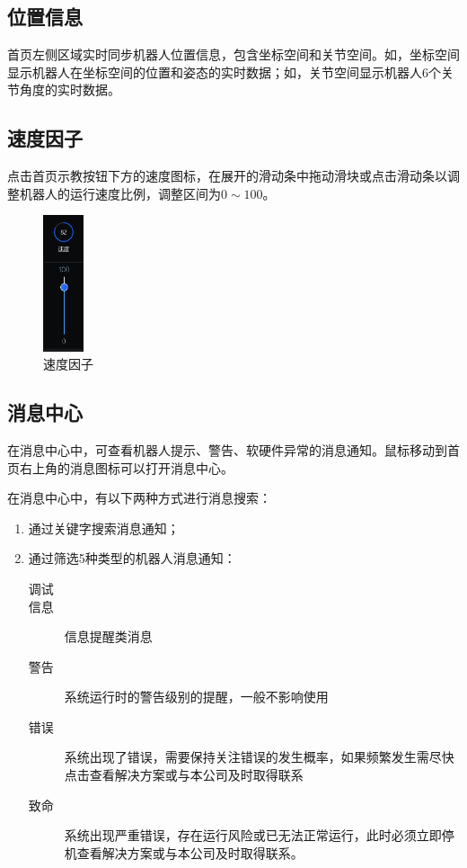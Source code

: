 \subsection{位置信息}
\LM 首页左侧区域实时同步机器人位置信息，包含坐标空间和关节空间。如，坐标空间显示机器人在坐标空间的位置和姿态的实时数据；如，关节空间显示机器人6个关节角度的实时数据。

\subsection{速度因子}
点击\LM 首页示教按钮下方的速度图标，在展开的滑动条中拖动滑块或点击滑动条以调整机器人的运行速度比例，调整区间为$0\sim 100$。

\begin{figure}[ht]
	\centering
	\includegraphics[height=4cm]{screen/2-13.png}
	\caption{速度因子}
	\label{fig:速度因子}
\end{figure}

\subsection{消息中心}
在消息中心中，可查看机器人提示、警告、软硬件异常的消息通知。鼠标移动到\LM 首页右上角的消息图标可以打开消息中心。

在消息中心中，有以下两种方式进行消息搜索：
\begin{enumerate}
	\item 通过关键字搜索消息通知；
	\item 通过筛选5种类型的机器人消息通知：
	\begin{description}
\item[ 调试]
\item[ 信息] 信息提醒类消息
\item[ 警告] 系统运行时的警告级别的提醒，一般不影响使用
\item[ 错误] 系统出现了错误，需要保持关注错误的发生概率，如果频繁发生需尽快点击查看解决方案或与本公司及时取得联系
\item[ 致命] 系统出现严重错误，存在运行风险或已无法正常运行，此时必须立即停机查看解决方案或与本公司及时取得联系。
	\end{description}
\end{enumerate}

